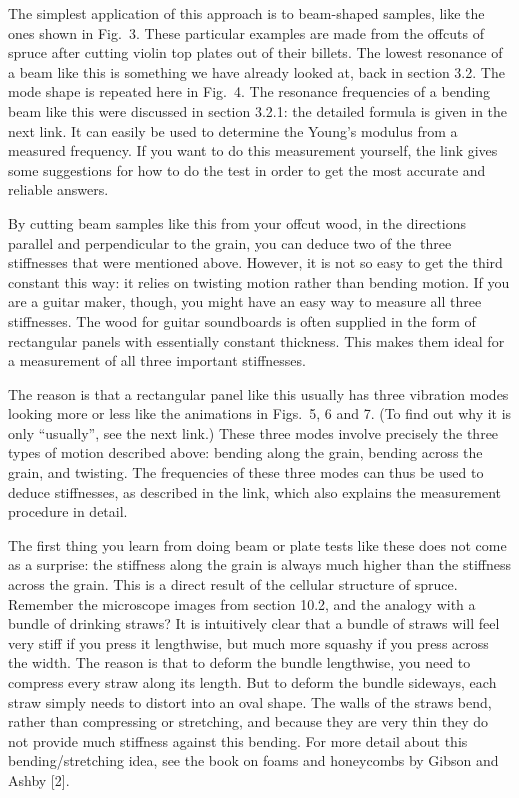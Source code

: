   The simplest application of this approach is to beam-shaped samples, like the 
  ones shown in Fig.\ 3. These particular examples are made from the offcuts of 
  spruce after cutting violin top plates out of their billets. The lowest 
  resonance of a beam like this is something we have already looked at, back in 
  section 3.2. The mode shape is repeated here in Fig.\ 4. The resonance 
  frequencies of a bending beam like this were discussed in section 3.2.1: the 
  detailed formula is given in the next link. It can easily be used to 
  determine the Young’s modulus from a measured frequency. If you want to do 
  this measurement yourself, the link gives some suggestions for how to do the 
  test in order to get the most accurate and reliable answers. 

  By cutting beam samples like this from your offcut wood, in the directions 
  parallel and perpendicular to the grain, you can deduce two of the three 
  stiffnesses that were mentioned above. However, it is not so easy to get the 
  third constant this way: it relies on twisting motion rather than bending 
  motion. If you are a guitar maker, though, you might have an easy way to 
  measure all three stiffnesses. The wood for guitar soundboards is often 
  supplied in the form of rectangular panels with essentially constant 
  thickness. This makes them ideal for a measurement of all three important 
  stiffnesses. 

  The reason is that a rectangular panel like this usually has three vibration 
  modes looking more or less like the animations in Figs.\ 5, 6 and 7. (To find 
  out why it is only “usually”, see the next link.) These three modes involve 
  precisely the three types of motion described above: bending along the grain, 
  bending across the grain, and twisting. The frequencies of these three modes 
  can thus be used to deduce stiffnesses, as described in the link, which also 
  explains the measurement procedure in detail. 

  The first thing you learn from doing beam or plate tests like these does not 
  come as a surprise: the stiffness along the grain is always much higher than 
  the stiffness across the grain. This is a direct result of the cellular 
  structure of spruce. Remember the microscope images from section 10.2, and 
  the analogy with a bundle of drinking straws? It is intuitively clear that a 
  bundle of straws will feel very stiff if you press it lengthwise, but much 
  more squashy if you press across the width. The reason is that to deform the 
  bundle lengthwise, you need to compress every straw along its length. But to 
  deform the bundle sideways, each straw simply needs to distort into an oval 
  shape. The walls of the straws bend, rather than compressing or stretching, 
  and because they are very thin they do not provide much stiffness against 
  this bending. For more detail about this bending/stretching idea, see the 
  book on foams and honeycombs by Gibson and Ashby [2]. 

